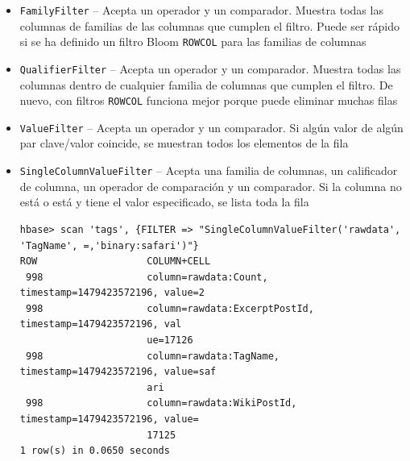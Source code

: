 \documentclass[14pt]{beamer}
\begin{document}
\begin{frame}
\begin{itemize}
\item {\tt FamilyFilter} -- Acepta un operador y un comparador. Muestra
  todas las columnas de familias de las columnas que cumplen el filtro.
  Puede ser rápido si se ha definido un filtro Bloom {\tt ROWCOL} para las
  familias de columnas

\item {\tt QualifierFilter} -- Acepta un operador y un comparador. Muestra
  todas las columnas dentro de cualquier familia de columnas que cumplen el
  filtro. De nuevo, con filtros {\tt ROWCOL} funciona mejor porque puede
  eliminar muchas filas




\item {\tt ValueFilter} -- Acepta un operador y un comparador. Si algún
  valor de algún par clave/valor coincide, se muestran todos los elementos
  de la fila


  \framebreak

\item {\tt SingleColumnValueFilter} -- Acepta una familia de columnas, un
  calificador de columna, un operador de comparación y un comparador. Si la
  columna no está o está y tiene el valor especificado, se lista toda la
  fila

\begin{lstlisting}
hbase> scan 'tags', {FILTER => "SingleColumnValueFilter('rawdata', 'TagName', =,'binary:safari')"}
ROW                   COLUMN+CELL
 998                  column=rawdata:Count, timestamp=1479423572196, value=2
 998                  column=rawdata:ExcerptPostId, timestamp=1479423572196, val
                      ue=17126
 998                  column=rawdata:TagName, timestamp=1479423572196, value=saf
                      ari
 998                  column=rawdata:WikiPostId, timestamp=1479423572196, value=
                      17125
1 row(s) in 0.0650 seconds
\end{lstlisting}


\end{itemize}
\end{frame}
\end{document}
